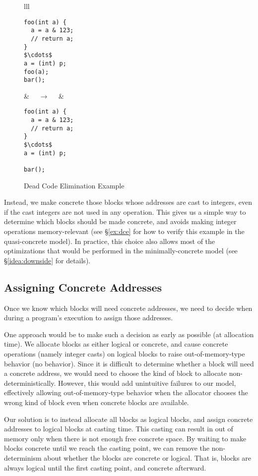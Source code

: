 \begin{figure}[t]
\center
\begin{tabular}{lll}
\begin{lstlisting}
foo(int a) {
  a = a & 123;
  // return a;
}
$\cdots$
a = (int) p;
foo(a);
bar();
\end{lstlisting}
&
$\quad\rightarrow\quad$
&
\begin{lstlisting}
foo(int a) {
  a = a & 123;
  // return a;
}
$\cdots$
a = (int) p;

bar();
\end{lstlisting}
\end{tabular}
\caption{Dead Code Elimination Example}\label{code:dce}
\end{figure}

Instead, we make concrete those blocks whose addresses are cast to integers, 
even if the cast integers are not used in any operation. This gives us a simple way to determine which blocks should be made concrete, and avoids making integer operations memory-relevant 
(see \S\ref{ex:dce} for how to verify this example in the
quasi-concrete model). In practice, this choice also allows most of the optimizations that would be performed in the minimally-concrete model (see \S\ref{idea:downside} for details).

\subsection{Assigning Concrete Addresses}
\label{idea:ownership}

Once we know which blocks will need concrete addresses, we need to
decide when during a program's execution to assign those addresses.

One approach would be to make such a decision as early as possible
(\ie at allocation time). We allocate blocks as either logical or
concrete, and cause concrete operations (namely integer casts) on
logical blocks to raise out-of-memory-type behavior (\ie no behavior).
Since it is difficult to determine whether a block will need a
concrete address,
we would need to choose the kind of block to allocate
non-deterministically. However, this would add unintuitive failures to
our model, effectively allowing out-of-memory-type behavior when the
allocator chooses the wrong kind of block even when concrete blocks
are available.

Our solution is to instead allocate all blocks as logical blocks, and assign concrete addresses to logical blocks at casting time. This casting can result in out of memory only when there is not enough free concrete space. By waiting to make blocks concrete until we reach the casting point,
we can remove the non-determinism about whether the blocks are
concrete or logical. That is, blocks are always logical until the
first casting point, and concrete afterward.

